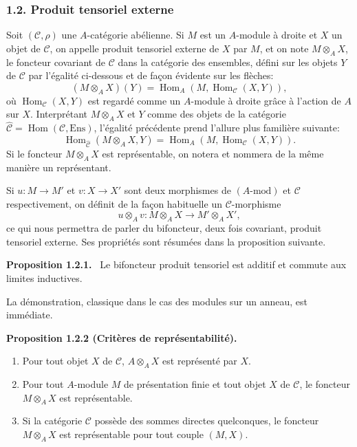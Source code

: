 \documentclass[11pt]{article}
\newenvironment{statement}[1]{\par\medskip\noindent\textbf{#1.}\ }{\par\medskip}
\DeclareMathOperator{\Hom}{Hom}
\providecommand{\Hom}{\operatorname{Hom}}
\providecommand{\Ens}{\mathrm{Ens}}
\providecommand{\cC}{\mathcal C}
\begin{document}
\subsubsection*{1.2. Produit tensoriel externe}
Soit $(\cC,\rho)$ une $A$-catégorie abélienne. Si $M$ est un $A$-module à droite et $X$ un objet de $\cC$, on appelle produit tensoriel externe de $X$ par $M$, et on note $M\otimes_A X$, le foncteur covariant de $\cC$ dans la catégorie des ensembles, défini sur les objets $Y$ de $\cC$ par l'égalité ci-dessous et de façon évidente sur les flèches:
\[
(M\otimes_A X)(Y)=\Hom_A(M,\Hom_{\cC}(X,Y)),
\]
où $\Hom_{\cC}(X,Y)$ est regardé comme un $A$-module à droite grâce à l'action de $A$ sur $X$. Interprétant $M\otimes_AX$ et $Y$ comme des objets de la catégorie $\widehat{\cC}=\Hom(\cC,\Ens)$, l'égalité précédente prend l'allure plus familière suivante:
\[
\Hom_{\widehat{\cC}}(M\otimes_A X,Y)=\Hom_A(M,\Hom_{\cC}(X,Y)).
\]
Si le foncteur $M\otimes_A X$ est représentable, on notera et nommera de la même manière un représentant.

Si $u:M\to M'$ et $v:X\to X'$ sont deux morphismes de $(A\text{-mod})$ et $\cC$ respectivement, on définit de la façon habituelle un $\cC$-morphisme
\[
u\otimes_A v:M\otimes_A X\longrightarrow M'\otimes_A X',
\]
ce qui nous permettra de parler du bifoncteur, deux fois covariant, produit tensoriel externe. Ses propriétés sont résumées dans la proposition suivante.

\begin{statement}{Proposition 1.2.1}
Le bifoncteur produit tensoriel est additif et commute aux limites inductives.
\end{statement}
La démonstration, classique dans le cas des modules sur un anneau, est immédiate.

\begin{statement}{Proposition 1.2.2 (Critères de représentabilité)}
\begin{enumerate}[label=(\alph*)]
\item Pour tout objet $X$ de $\cC$, $A\otimes_AX$ est représenté par $X$.
\item Pour tout $A$-module $M$ de présentation finie et tout objet $X$ de $\cC$, le foncteur $M\otimes_AX$ est représentable.
\item Si la catégorie $\cC$ possède des sommes directes quelconques, le foncteur $M\otimes_A X$ est représentable pour tout couple $(M,X)$.
\end{enumerate}
\end{statement}
\end{document}
